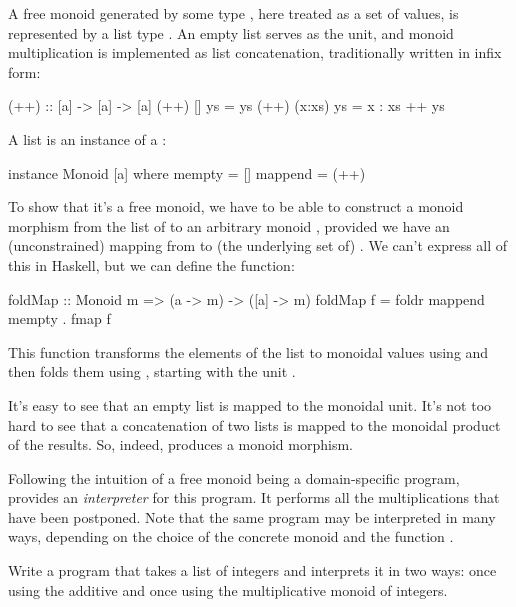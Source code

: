 \documentclass[DaoFP]{subfiles}
\begin{document}
A free monoid generated by some type , here treated as a set of values, is represented by a list type \hask{[a]}. An empty list serves as the unit, and monoid multiplication is implemented as list concatenation, traditionally written in infix form:
\begin{haskell}
(++) :: [a] -> [a] -> [a]
(++) []     ys = ys
(++) (x:xs) ys = x : xs ++ ys
\end{haskell}
A list is an instance of a :
\begin{haskell}
instance Monoid [a] where
  mempty = []
  mappend = (++)
\end{haskell}

To show that it's a free monoid, we have to be able to construct a monoid morphism from the list of  to an arbitrary monoid , provided we have an (unconstrained) mapping from  to (the underlying set of) . We can't express all of this in Haskell, but we can define the function:
\begin{haskell}
foldMap :: Monoid m => (a -> m) -> ([a] -> m)
foldMap f = foldr mappend mempty . fmap f
\end{haskell}
This function transforms the elements of the list to monoidal values using  and then folds them using , starting with the unit . 

It's easy to see that an empty list is mapped to the monoidal unit. It's not too hard to see that a concatenation of two lists is mapped to the monoidal product of the results. So, indeed,  produces a monoid morphism. 

Following the intuition of a free monoid being a domain-specific program,  provides an \emph{interpreter} for this program. It performs all the multiplications that have been postponed. Note that the same program may be interpreted in many ways, depending on the choice of the concrete monoid and the function .

\begin{exercise}
Write a program that takes a list of integers and interprets it in two ways: once using the additive and once using the multiplicative monoid of integers.
\end{exercise}
\end{document}
